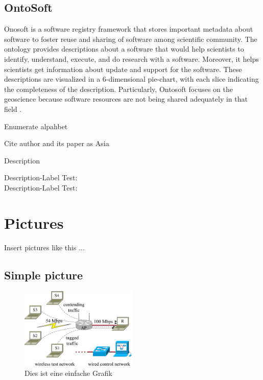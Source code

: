 \subsection{OntoSoft}

Onosoft is a software registry framework that stores important metadata about software to foster reuse and sharing of software among scientific community. The ontology provides descriptions about a software that would help scientists to identify, understand, execute, and do research with a software. Moreover, it helps scientists get information about update and support for the software. These descriptions are visualized in a 6-dimensional pie-chart, with each slice indicating the completeness of the description. Particularly, Ontosoft focuses on the geoscience because software resources are not being shared adequately in that field \cite{gil2015ontosoft}.

Enumerate alpahbet

\begin{aenumerate}
	\item
	\item

\end{aenumerate}

Cite author and its paper as  Asia \citeauthor{bentley:1999} \citep{bentley:1999} 

Description

\begin{description}
  \item[Description-Label Test:] 
  \item[Description-Label Test:] 
\end{description}

%
%
\section{Pictures}
\label{sec:chapter03:Pictures}
Insert pictures like this ...

\subsection{Simple picture}
\label{sec:chapter03:grafiken:simple}


\begin{figure}[htbp]
 \centering
 \includegraphics[width=0.5\textwidth]{4.graphics/figures/setup}
 \caption{Dies ist eine einfache Grafik}
 \label{fig:chapter03:setup}
\end{figure}




